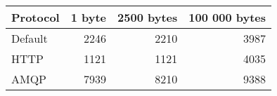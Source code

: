 \begin{tabularx}{\textwidth}{lrrr}
\hline
 Protocol   &   1 byte &   2500 bytes &   100 000 bytes \\
\hline
 Default    &     2246 &         2210 &            3987 \\
 HTTP       &     1121 &         1121 &            4035 \\
 AMQP       &     7939 &         8210 &            9388 \\
\hline
\end{tabularx}